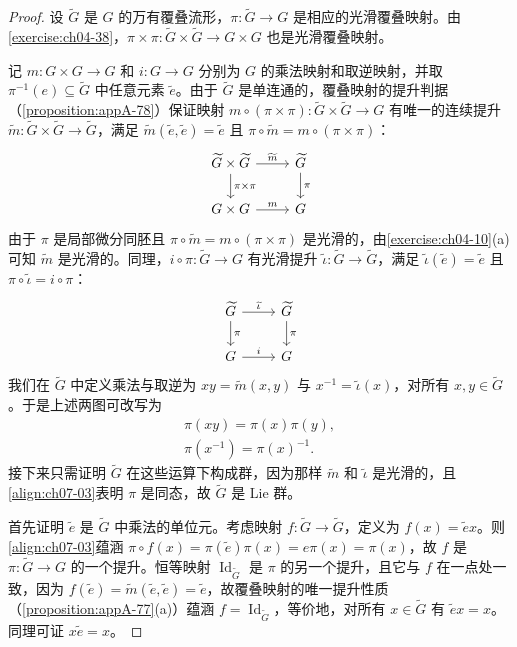 \documentclass[../../main.tex]{subfiles}
\begin{document}
\begin{proof}
设 $\widetilde{G}$ 是 $G$ 的万有覆叠流形，$\pi\colon\widetilde{G}\to G$ 是相应的光滑覆叠映射。由\cref{exercise:ch04-38}，$\pi\times\pi\colon\widetilde{G}\times\widetilde{G}\to G\times G$ 也是光滑覆叠映射。

记 $m\colon G\times G\to G$ 和 $i\colon G\to G$ 分别为 $G$ 的乘法映射和取逆映射，并取 $\pi^{-1}(e)\subseteq\widetilde{G}$ 中任意元素 $\tilde{e}$。由于 $\widetilde{G}$ 是单连通的，覆叠映射的提升判据（\cref{proposition:appA-78}）保证映射 $m\circ(\pi\times\pi)\colon\widetilde{G}\times\widetilde{G}\to G$ 有唯一的连续提升 $\widetilde{m}\colon\widetilde{G}\times\widetilde{G}\to\widetilde{G}$，满足 $\widetilde{m}(\tilde{e},\tilde{e})=\tilde{e}$ 且 $\pi\circ\widetilde{m}=m\circ(\pi\times\pi)$：
\begin{align*}
\begin{tikzcd}[ampersand replacement=\&]
\widetilde{G}\times\widetilde{G} \ar{r}{\widetilde{m}} \ar{d}{\pi\times\pi} \& \widetilde{G} \ar{d}{\pi}\\
G\times G \ar{r}{m} \& G
\end{tikzcd}
\end{align*}
由于 $\pi$ 是局部微分同胚且 $\pi\circ\widetilde{m}=m\circ(\pi\times\pi)$ 是光滑的，由\cref{exercise:ch04-10}(a)可知 $\widetilde{m}$ 是光滑的。同理，$i\circ\pi\colon\widetilde{G}\to G$ 有光滑提升 $\widetilde{\iota}\colon\widetilde{G}\to\widetilde{G}$，满足 $\widetilde{\iota}(\tilde{e})=\tilde{e}$ 且 $\pi\circ\widetilde{\iota}=i\circ\pi$：
\begin{align*}
\begin{tikzcd}[ampersand replacement=\&]
\widetilde{G} \ar{r}{\widetilde{\iota}} \ar{d}{\pi} \& \widetilde{G} \ar{d}{\pi}\\
G \ar{r}{i} \& G
\end{tikzcd}
\end{align*}
我们在 $\widetilde{G}$ 中定义乘法与取逆为 $xy=\widetilde{m}(x,y)$ 与 $x^{-1}=\widetilde{\iota}(x)$，对所有 $x,y\in\widetilde{G}$。于是上述两图可改写为
\begin{align}
\pi(xy)=\pi(x)\pi(y),\label{align:ch07-03}\\
\pi(x^{-1})=\pi(x)^{-1}.\label{align:ch07-04}
\end{align}
接下来只需证明 $\widetilde{G}$ 在这些运算下构成群，因为那样 $\widetilde{m}$ 和 $\widetilde{\iota}$ 是光滑的，且\eqref{align:ch07-03}表明 $\pi$ 是同态，故 $\widetilde{G}$ 是 Lie 群。

首先证明 $\tilde{e}$ 是 $\widetilde{G}$ 中乘法的单位元。考虑映射 $f\colon\widetilde{G}\to\widetilde{G}$，定义为 $f(x)=\tilde{e}x$。则\eqref{align:ch07-03}蕴涵 $\pi\circ f(x)=\pi(\tilde{e})\pi(x)=e\pi(x)=\pi(x)$，故 $f$ 是 $\pi\colon\widetilde{G}\to G$ 的一个提升。恒等映射 $\operatorname{Id}_{\widetilde{G}}$ 是 $\pi$ 的另一个提升，且它与 $f$ 在一点处一致，因为 $f(\tilde{e})=\widetilde{m}(\tilde{e},\tilde{e})=\tilde{e}$，故覆叠映射的唯一提升性质（\cref{proposition:appA-77}(a)）蕴涵 $f=\operatorname{Id}_{\widetilde{G}}$，等价地，对所有 $x\in\widetilde{G}$ 有 $\tilde{e}x=x$。同理可证 $x\tilde{e}=x$。


\end{proof}
\end{document}

